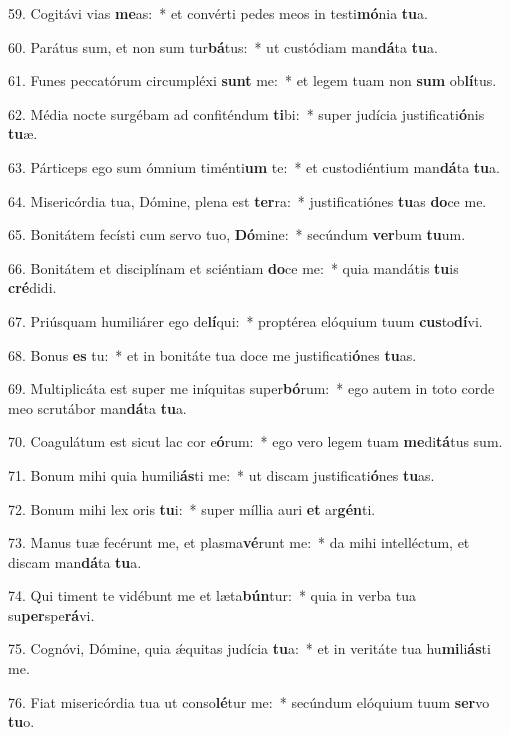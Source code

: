 59. Cogitávi vias \textbf{me}as:~*  et convérti pedes meos in testi\textbf{mó}nia \textbf{tu}a.\

60. Parátus sum, et non sum tur\textbf{bá}tus:~*  ut custódiam man\textbf{dá}ta \textbf{tu}a.\

61. Funes peccatórum circumpléxi \textbf{sunt} me:~*  et legem tuam non \textbf{sum} ob\textbf{lí}tus.\

62. Média nocte surgébam ad confiténdum \textbf{ti}bi:~*  super judícia justificati\textbf{ó}nis \textbf{tu}æ.\

63. Párticeps ego sum ómnium timénti\textbf{um} te:~*  et custodiéntium man\textbf{dá}ta \textbf{tu}a.\

64. Misericórdia tua, Dómine, plena est \textbf{ter}ra:~*  justificatiónes \textbf{tu}as \textbf{do}ce me.\

65. Bonitátem fecísti cum servo tuo, \textbf{Dó}mine:~*  secúndum \textbf{ver}bum \textbf{tu}um.\

66. Bonitátem et disciplínam et sciéntiam \textbf{do}ce me:~*  quia mandátis \textbf{tu}is \textbf{cré}didi.\

67. Priúsquam humiliárer ego de\textbf{lí}qui:~*  proptérea elóquium tuum \textbf{cus}to\textbf{dí}vi.\

68. Bonus \textbf{es} tu:~*  et in bonitáte tua doce me justificati\textbf{ó}nes \textbf{tu}as.\

69. Multiplicáta est super me iníquitas super\textbf{bó}rum:~*  ego autem in toto corde meo scrutábor man\textbf{dá}ta \textbf{tu}a.\

70. Coagulátum est sicut lac cor e\textbf{ó}rum:~*  ego vero legem tuam \textbf{me}di\textbf{tá}tus sum.\

71. Bonum mihi quia humili\textbf{ás}ti me:~*  ut discam justificati\textbf{ó}nes \textbf{tu}as.\

72. Bonum mihi lex oris \textbf{tu}i:~*  super míllia auri \textbf{et} ar\textbf{gén}ti.\

73. Manus tuæ fecérunt me, et plasma\textbf{vé}runt me:~*  da mihi intelléctum, et discam man\textbf{dá}ta \textbf{tu}a.\

74. Qui timent te vidébunt me et læta\textbf{bún}tur:~*  quia in verba tua su\textbf{per}spe\textbf{rá}vi.\

75. Cognóvi, Dómine, quia ǽquitas judícia \textbf{tu}a:~*  et in veritáte tua hu\textbf{mi}li\textbf{ás}ti me.\

76. Fiat misericórdia tua ut conso\textbf{lé}tur me:~*  secúndum elóquium tuum \textbf{ser}vo \textbf{tu}o.\

